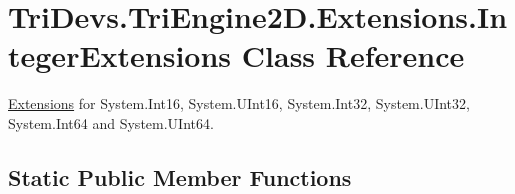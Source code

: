 \hypertarget{class_tri_devs_1_1_tri_engine2_d_1_1_extensions_1_1_integer_extensions}{\section{Tri\-Devs.\-Tri\-Engine2\-D.\-Extensions.\-Integer\-Extensions Class Reference}
\label{class_tri_devs_1_1_tri_engine2_d_1_1_extensions_1_1_integer_extensions}
}


\hyperlink{namespace_tri_devs_1_1_tri_engine2_d_1_1_extensions}{Extensions} for System.\-Int16, System.\-U\-Int16, System.\-Int32, System.\-U\-Int32, System.\-Int64 and System.\-U\-Int64.  


\subsection*{Static Public Member Functions}
